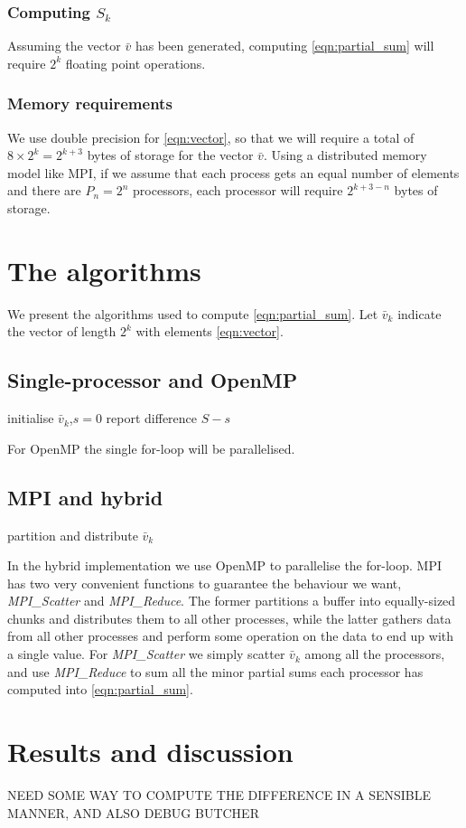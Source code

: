 \documentclass[11pt]{article}
\begin{document}
\subsubsection{Computing $S_k$}
Assuming the vector $\bar{v}$ has been generated, computing \eqref{eqn:partial_sum} will require $2^k$ floating point operations. 
\subsubsection{Memory requirements}
We use double precision for \eqref{eqn:vector}, so that we will require a total of $8 \times 2^k = 2^{k+3}$ bytes of storage for the vector $\bar{v}$. Using a distributed memory model like MPI, if we assume that each process gets an equal number of elements and there are $P_n=2^n$ processors, each processor will require $2^{k+3-n}$ bytes of storage.  
\section{The algorithms}

We present the algorithms used to compute \eqref{eqn:partial_sum}. Let $\bar{v}_k$ indicate the vector of length $2^k$ with elements \eqref{eqn:vector}.
\subsection{Single-processor and OpenMP}
\begin{algorithm}[H]
 initialise $\bar{v}_k$,$s=0$\;
 report difference $S-s$
\end{algorithm}
For OpenMP the single for-loop will be parallelised.
\subsection{MPI and hybrid}
\begin{algorithm}[H]
 partition and distribute $\bar{v}_k$\;
 \
\end{algorithm}
In the hybrid implementation we use OpenMP to parallelise the for-loop. MPI has two very convenient functions to guarantee the behaviour we want, \textit{MPI\_Scatter} and \textit{MPI\_Reduce}. The former partitions a buffer into equally-sized chunks and distributes them to all other processes, while the latter gathers data from all other processes and perform some operation on the data to end up with a single value. For \textit{MPI\_Scatter} we simply scatter $\bar{v}_k$ among all the processors, and use \textit{MPI\_Reduce} to sum all the minor partial sums each processor has computed into \eqref{eqn:partial_sum}.
\section{Results and discussion}
NEED SOME WAY TO COMPUTE THE DIFFERENCE IN A SENSIBLE MANNER, AND ALSO DEBUG BUTCHER
\end{document}
